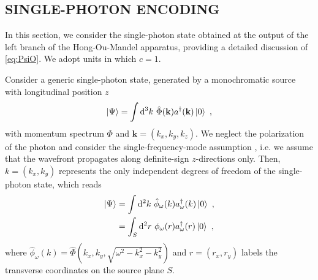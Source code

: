 \documentclass[reprint,
superscriptaddress,
nofootinbib,
aps,
pra,
showkeys
]{revtex4-2}
\newcommand*\dif{\mathop{}\!\mathrm{d}}
\begin{document}
\appendix
\begin{widetext}
\section{SINGLE-PHOTON ENCODING\label{app:Imaging}}
In this section, we consider the single-photon state obtained at the output of the left branch of the Hong-Ou-Mandel apparatus, providing a detailed discussion of \cref{eq:PsiO}. We adopt units in which $c = 1$.

Consider a generic single-photon state, generated by a monochromatic source with longitudinal position $z$
\begin{equation}
	\ket{\Psi} = \int \dif^3k \ \hat{\Phi}(\mathbf{k}) a^{\dagger}(\mathbf{k})\ket{0} \ ,
\end{equation}
with momentum spectrum $\Phi$ and $ \mathbf{k} = (k_x,k_y,k_z)$. We neglect the polarization of the photon and consider the single-frequency-mode assumption \citep{art:Rezai}, i.e. we assume that the wavefront propagates along definite-sign $z$-directions only. Then, $k = (k_x,k_y)$ represents the only independent degrees of freedom of the single-photon state, which reads
\begin{align}
	\ket{\Psi} &= \int \dif^2k \ \hat{\phi}_\omega(k) a^\dagger_\omega(k)\ket{0} \ , \\
	 &= \int_S \dif^2r \ \phi_\omega(r) a_{\omega}^\dagger(r)\ket{0} \ ,
\end{align}
where $\hat{\phi}_\omega(k) = \hat{\Phi}\left(k_x,k_y,\sqrt{\omega^2-k_x^2-k_y^2}\right)$ and $r = (r_x,r_y)$ labels the transverse coordinates on the source plane $S$.


\end{widetext}
\end{document}
